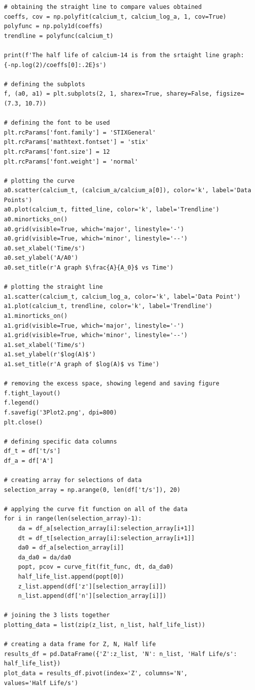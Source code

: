 \documentclass[12pt, a4paper]{article}
\begin{document}
\begin{verbatim}
# obtaining the straight line to compare values obtained
coeffs, cov = np.polyfit(calcium_t, calcium_log_a, 1, cov=True)
polyfunc = np.poly1d(coeffs)
trendline = polyfunc(calcium_t)

print(f'The half life of calcium-14 is from the srtaight line graph: {-np.log(2)/coeffs[0]:.2E}s')

# defining the subplots
f, (a0, a1) = plt.subplots(2, 1, sharex=True, sharey=False, figsize=(7.3, 10.7))

# defining the font to be used
plt.rcParams['font.family'] = 'STIXGeneral'
plt.rcParams['mathtext.fontset'] = 'stix'
plt.rcParams['font.size'] = 12
plt.rcParams['font.weight'] = 'normal'

# plotting the curve
a0.scatter(calcium_t, (calcium_a/calcium_a[0]), color='k', label='Data Points')
a0.plot(calcium_t, fitted_line, color='k', label='Trendline')
a0.minorticks_on()
a0.grid(visible=True, which='major', linestyle='-')
a0.grid(visible=True, which='minor', linestyle='--')
a0.set_xlabel('Time/s')
a0.set_ylabel('A/A0')
a0.set_title(r'A graph $\frac{A}{A_0}$ vs Time')

# plotting the straight line
a1.scatter(calcium_t, calcium_log_a, color='k', label='Data Point')
a1.plot(calcium_t, trendline, color='k', label='Trendline')
a1.minorticks_on()
a1.grid(visible=True, which='major', linestyle='-')
a1.grid(visible=True, which='minor', linestyle='--')
a1.set_xlabel('Time/s')
a1.set_ylabel(r'$log(A)$')
a1.set_title(r'A graph of $log(A)$ vs Time')

# removing the excess space, showing legend and saving figure
f.tight_layout()
f.legend()
f.savefig('3Plot2.png', dpi=800)
plt.close()

# defining specific data columns
df_t = df['t/s']
df_a = df['A']

# creating array for selections of data
selection_array = np.arange(0, len(df['t/s']), 20)

# applying the curve fit function on all of the data
for i in range(len(selection_array)-1):
    da = df_a[selection_array[i]:selection_array[i+1]]
    dt = df_t[selection_array[i]:selection_array[i+1]]
    da0 = df_a[selection_array[i]]
    da_da0 = da/da0
    popt, pcov = curve_fit(fit_func, dt, da_da0)
    half_life_list.append(popt[0])
    z_list.append(df['z'][selection_array[i]])
    n_list.append(df['n'][selection_array[i]])

# joining the 3 lists together
plotting_data = list(zip(z_list, n_list, half_life_list))

# creating a data frame for Z, N, Half life
results_df = pd.DataFrame({'Z':z_list, 'N': n_list, 'Half Life/s': half_life_list})
plot_data = results_df.pivot(index='Z', columns='N',
values='Half Life/s')


\end{verbatim}
\end{document}
